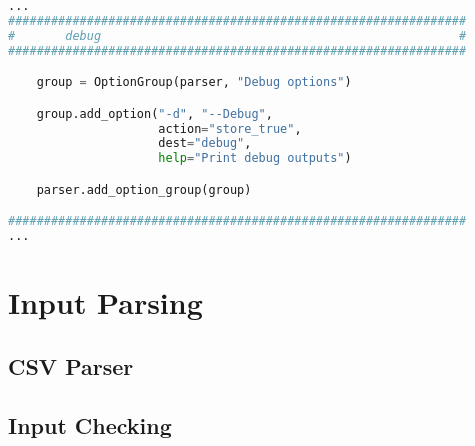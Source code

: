 \begin{inconsolata}
\begin{minipage}{\linewidth}
\begin{lstlisting}[language=python]
...
################################################################
#       debug                                                  #
################################################################

    group = OptionGroup(parser, "Debug options")

    group.add_option("-d", "--Debug",
                     action="store_true",
                     dest="debug",
                     help="Print debug outputs")

    parser.add_option_group(group)

################################################################
...
\end{lstlisting}
\end{minipage}
\end{inconsolata}


\section{Input Parsing}
\label{sec:inputpars}

\subsection{CSV Parser}
\label{sec:csvparse}

\subsection{Input Checking}
\label{sec:inputcheck}
